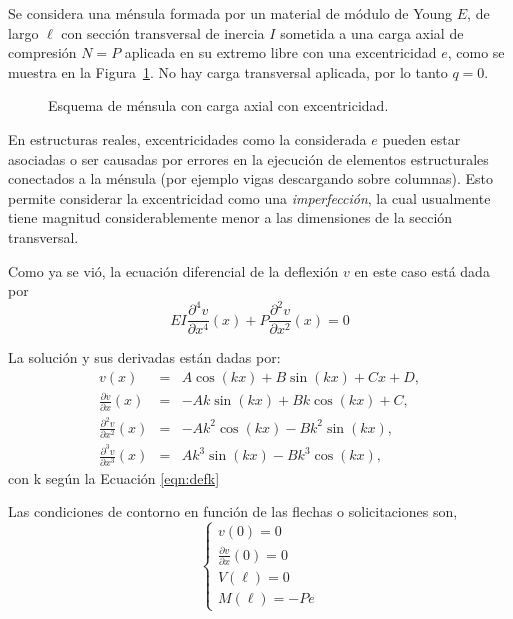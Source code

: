 Se considera una ménsula formada por un material de módulo de Young $E$, de largo $\ell$ con sección transversal de inercia $I$ sometida a una carga axial de compresión $N=P$ aplicada en su extremo libre con una excentricidad $e$, como se muestra en la Figura~\ref{fig:esqpand}. %
%
No hay carga transversal aplicada, por lo tanto $q=0$. %

\begin{figure}[htb]
\centering
\def\svgwidth{0.7\textwidth}

\caption{Esquema de ménsula con carga axial con excentricidad.}
\label{fig:esqpand}
\end{figure}

En estructuras reales, excentricidades como la considerada $e$ pueden estar asociadas o ser causadas por errores en la ejecución de elementos estructurales conectados a la ménsula (por ejemplo vigas descargando sobre columnas). %
%
Esto permite considerar la excentricidad como una \textit{imperfección}, la cual usualmente tiene magnitud considerablemente menor a las dimensiones de la sección transversal. %

Como ya se vió, la ecuación diferencial de la deflexión $v$ en este caso está dada por
%
$$
  E I \frac{\partial^4 v}{\partial x^4}(x)
+   P \frac{\partial^2 v}{\partial x^2}(x)
=   0
$$

La solución y sus derivadas están dadas por:
\begin{eqnarray}
v(x) &=& A \cos(k x ) + B \sin(kx) + C x + D, \\
\frac{\partial   v}{\partial x  } (x) &=& -A k \sin(k x ) + B k \cos(kx) + C , \\
\frac{\partial^2 v}{\partial x^2} (x) &=& - A k^2 \cos(k x ) - B k^2 \sin(kx),  \\
\frac{\partial^3 v}{\partial x^3} (x) &=& A k^3 \sin(k x ) - B k^3 \cos(kx), 
\end{eqnarray}
con k según la Ecuación \eqref{eqn:defk}

Las condiciones de contorno en función de las flechas o solicitaciones son,
\begin{equation}
\left\{
\begin{array}{l}
v(0)=0 \\[.5em]
\displaystyle \frac{\partial v}{\partial x}(0)=0\\[1em]
V(\ell)=0\\[.5em]
M(\ell)=-P e
\end{array}
\right.
\end{equation}

